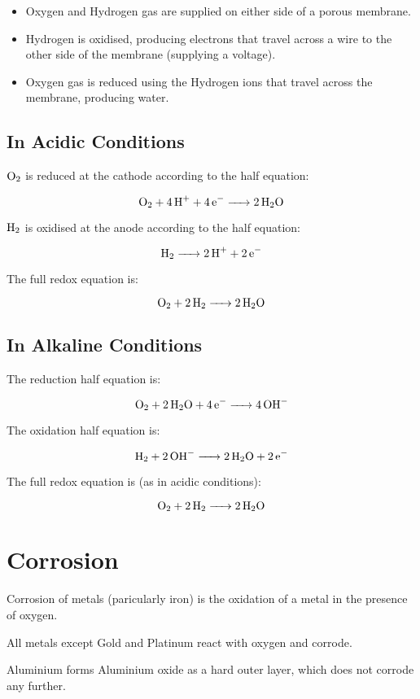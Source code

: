 \documentclass[a4paper,11pt]{article}
\begin{document}
\begin{itemize}
\item Oxygen and Hydrogen gas are supplied on either side of a porous membrane.
\item Hydrogen is oxidised, producing electrons that travel across a wire to the
	other side of the membrane (supplying a voltage).
\item Oxygen gas is reduced using the Hydrogen ions that travel across the
	membrane, producing water.
\end{itemize}

\subsection{In Acidic Conditions}

$\ce{O2}$ is reduced at the cathode according to the half equation:

$$
\ce{O2 + 4H+ + 4e- -> 2H2O}
$$

$\ce{H2}$ is oxidised at the anode according to the half equation:

$$
\ce{H2 -> 2H+ + 2e-}
$$

The full redox equation is:

$$
\ce{O2 + 2H2 -> 2H2O}
$$

\subsection{In Alkaline Conditions}

The reduction half equation is:

$$
\ce{O2 + 2H2O + 4e- -> 4OH-}
$$

The oxidation half equation is:

$$
\ce{H2 + 2OH- -> 2H2O + 2e-}
$$

The full redox equation is (as in acidic conditions):

$$
\ce{O2 + 2H2 -> 2H2O}
$$



\section{Corrosion}

Corrosion of metals (paricularly iron) is the oxidation of a metal in the
presence of oxygen.

All metals except Gold and Platinum react with oxygen and corrode.

Aluminium forms Aluminium oxide as a hard outer layer, which does not corrode
any further.
\end{document}
